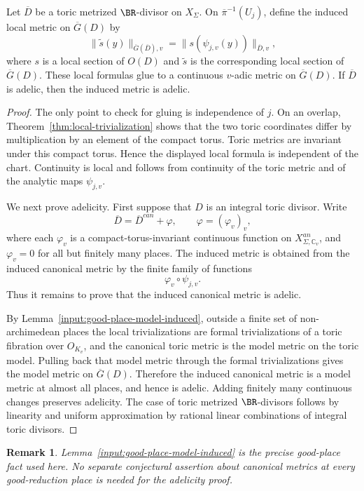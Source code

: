 \documentclass[10pt,a4paper]{amsart}
\theoremstyle{plain}
\newtheorem{remark}[theorem]{Remark}
\theoremstyle{plain}
\numberwithin{equation}{section}
\providecommand{\bD}{\overline{D}}
\begin{document}
\begin{prop}\label{prop:induced-metric-adelic}
	Let \(\bD\) be a toric metrized \(\BR\)-divisor on \(X_\Sigma\).  On
	\(\overline\pi^{-1}(U_j)\), define the induced local metric on
	\(\overline G(D)\) by
	\[
	\|\widetilde s(y)\|_{\overline G(\bD),v}
	=
	\|s(\psi_{j,v}(y))\|_{\bD,v},
	\]
	where \(s\) is a local section of \(O(D)\) and \(\widetilde s\) is the
	corresponding local section of \(\overline G(D)\).  These local formulas glue
	to a continuous \(v\)-adic metric on \(\overline G(D)\).  If \(\bD\) is adelic,
	then the induced metric is adelic.
\end{prop}
\begin{proof}
	The only point to check for gluing is independence of \(j\).  On an overlap,
	Theorem~\ref{thm:local-trivialization} shows that the two toric coordinates
	differ by multiplication by an element of the compact torus.  Toric metrics
	are invariant under this compact torus.  Hence the displayed local formula is
	independent of the chart.  Continuity is local and follows from continuity of
	the toric metric and of the analytic maps \(\psi_{j,v}\).
	
	We next prove adelicity.  First suppose that \(D\) is an integral toric
	divisor.  Write
	\[
	\bD=\bD^{can}+\varphi,\qquad \varphi=(\varphi_v)_v,
	\]
	where each \(\varphi_v\) is a compact-torus-invariant continuous function on
	\(X_{\Sigma,\mathbb C_v}^{an}\), and \(\varphi_v=0\) for all but finitely many
	places.  The induced metric is obtained from the induced canonical metric by
	the finite family of functions
	\[
	\varphi_v\circ\psi_{j,v}.
	\]
	Thus it remains to prove that the induced canonical metric is adelic.
	
	By Lemma~\ref{input:good-place-model-induced}, outside a finite set of
	non-archimedean places the local trivializations are formal trivializations of
	a toric fibration over \(O_{K_v}\), and the canonical toric metric is the model
	metric on the toric model.  Pulling back that model metric through the formal
	trivializations gives the model metric on \(\overline G(D)\).  Therefore the
	induced canonical metric is a model metric at almost all places, and hence is
	adelic.  Adding finitely many continuous changes preserves adelicity.  The
	case of toric metrized \(\BR\)-divisors follows by linearity and uniform
	approximation by rational linear combinations of integral toric divisors.
\end{proof}

\begin{remark}
	Lemma~\ref{input:good-place-model-induced} is the precise good-place fact used
	here.  No separate conjectural assertion about canonical metrics at every
	good-reduction place is needed for the adelicity proof.
\end{remark}
\end{document}
